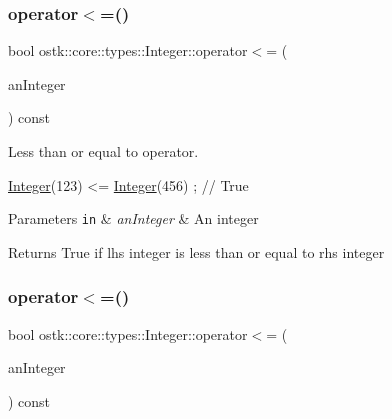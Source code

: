 \mbox{\label{classostk_1_1core_1_1types_1_1_integer_ae8d9f7d15f5f622ef6e6838778864052}} 
\subsubsection{\texorpdfstring{operator$<$=()}{operator<=()}\hspace{0.1cm}{\footnotesize\ttfamily [1/2]}}
{\footnotesize\ttfamily bool ostk\+::core\+::types\+::\+Integer\+::operator$<$= (\begin{DoxyParamCaption}\item[{const \hyperlink{classostk_1_1core_1_1types_1_1_integer}{Integer} \&}]{an\+Integer }\end{DoxyParamCaption}) const}



Less than or equal to operator. 


\begin{DoxyCode}
\hyperlink{classostk_1_1core_1_1types_1_1_integer_a209b939281106d4b590ad98fae291af9}{Integer}(123) <= \hyperlink{classostk_1_1core_1_1types_1_1_integer_a209b939281106d4b590ad98fae291af9}{Integer}(456) ; \textcolor{comment}{// True}
\end{DoxyCode}



\begin{DoxyParams}[1]{Parameters}
\mbox{\tt in}  & {\em an\+Integer} & An integer \\
\hline
\end{DoxyParams}
\begin{DoxyReturn}{Returns}
True if lhs integer is less than or equal to rhs integer 
\end{DoxyReturn}
\mbox{\label{classostk_1_1core_1_1types_1_1_integer_a271b38ab9bf7c6c791f21062bbc427c6}} 
\subsubsection{\texorpdfstring{operator$<$=()}{operator<=()}\hspace{0.1cm}{\footnotesize\ttfamily [2/2]}}
{\footnotesize\ttfamily bool ostk\+::core\+::types\+::\+Integer\+::operator$<$= (\begin{DoxyParamCaption}\item[{const \hyperlink{classostk_1_1core_1_1types_1_1_integer_a76a5f41f78659f116eafaf26cecc3244}{Integer\+::\+Value\+Type} \&}]{an\+Integer }\end{DoxyParamCaption}) const}

